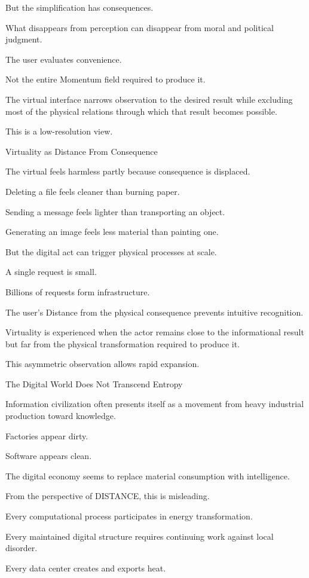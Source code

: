 But the simplification has consequences.

What disappears from perception can disappear from moral and political judgment.

The user evaluates convenience.

Not the entire Momentum field required to produce it.

The virtual interface narrows observation to the desired result while excluding most of the physical relations through which that result becomes possible.

This is a low-resolution view.

Virtuality as Distance From Consequence

The virtual feels harmless partly because consequence is displaced.

Deleting a file feels cleaner than burning paper.

Sending a message feels lighter than transporting an object.

Generating an image feels less material than painting one.

But the digital act can trigger physical processes at scale.

A single request is small.

Billions of requests form infrastructure.

The user’s Distance from the physical consequence prevents intuitive recognition.

Virtuality is experienced when the actor remains close to the informational result but far from the physical transformation required to produce it.

This asymmetric observation allows rapid expansion.

The Digital World Does Not Transcend Entropy

Information civilization often presents itself as a movement from heavy industrial production toward knowledge.

Factories appear dirty.

Software appears clean.

The digital economy seems to replace material consumption with intelligence.

From the perspective of DISTANCE, this is misleading.

Every computational process participates in energy transformation.

Every maintained digital structure requires continuing work against local disorder.

Every data center creates and exports heat.

